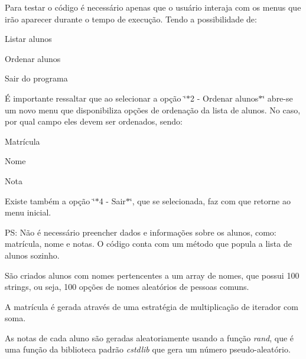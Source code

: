 Para testar o código é necessário apenas que o usuário interaja com os menus que irão aparecer durante o tempo de execução. Tendo a possibilidade de\+:


\begin{DoxyEnumerate}
\item Listar alunos
\item Ordenar alunos
\item Sair do programa
\end{DoxyEnumerate}

É importante ressaltar que ao selecionar a opção \char`\"{}$\ast$2 -\/ Ordenar alunos$\ast$\char`\"{} abre-\/se um novo menu que disponibiliza opções de ordenação da lista de alunos. No caso, por qual campo eles devem ser ordenados, sendo\+:


\begin{DoxyEnumerate}
\item Matrícula
\item Nome
\item Nota
\end{DoxyEnumerate}

Existe também a opção \char`\"{}$\ast$4 -\/ Sair$\ast$\char`\"{}, que se selecionada, faz com que retorne ao menu inicial.

PS\+: Não é necessário preencher dados e informações sobre os alunos, como\+: matrícula, nome e notas. O código conta com um método que popula a lista de alunos sozinho.

São criados alunos com nomes pertencentes a um array de nomes, que possui 100 strings, ou seja, 100 opções de nomes aleatórios de pessoas comuns.

A matrícula é gerada através de uma estratégia de multiplicação de iterador com soma.

As notas de cada aluno são geradas aleatoriamente usando a função {\itshape rand}, que é uma função da biblioteca padrão {\itshape cstdlib} que gera um número pseudo-\/aleatório. 